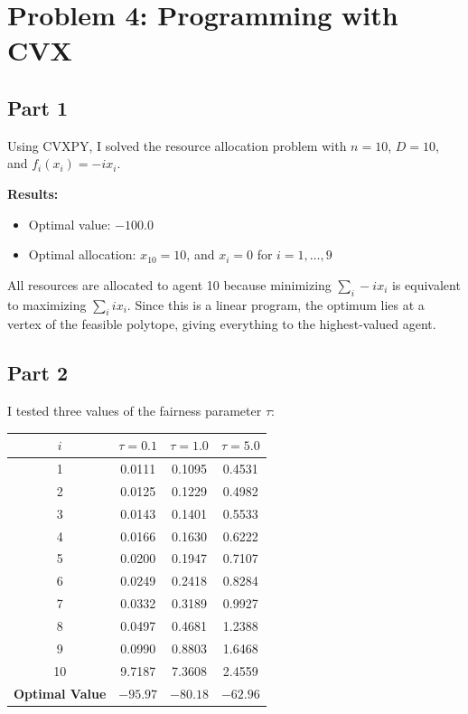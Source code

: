 \documentclass[11pt]{article}
\begin{document}
\section*{Problem 4: Programming with CVX}

\subsection*{Part 1}

Using CVXPY, I solved the resource allocation problem with $n = 10$, $D = 10$, and $f_i(x_i) = -ix_i$.

\textbf{Results:}
\begin{itemize}
    \item Optimal value: $-100.0$
    \item Optimal allocation: $x_{10} = 10$, and $x_i = 0$ for $i = 1, \ldots, 9$
\end{itemize}

All resources are allocated to agent 10 because minimizing $\sum_{i} -ix_i$ is equivalent to maximizing $\sum_{i} ix_i$. Since this is a linear program, the optimum lies at a vertex of the feasible polytope, giving everything to the highest-valued agent.

\subsection*{Part 2}

I tested three values of the fairness parameter $\tau$:

\begin{table}[h]
\centering
\begin{tabular}{c|ccc}
\toprule
$i$ & $\tau = 0.1$ & $\tau = 1.0$ & $\tau = 5.0$ \\
\midrule
1  & 0.0111 & 0.1095 & 0.4531 \\
2  & 0.0125 & 0.1229 & 0.4982 \\
3  & 0.0143 & 0.1401 & 0.5533 \\
4  & 0.0166 & 0.1630 & 0.6222 \\
5  & 0.0200 & 0.1947 & 0.7107 \\
6  & 0.0249 & 0.2418 & 0.8284 \\
7  & 0.0332 & 0.3189 & 0.9927 \\
8  & 0.0497 & 0.4681 & 1.2388 \\
9  & 0.0990 & 0.8803 & 1.6468 \\
10 & 9.7187 & 7.3608 & 2.4559 \\
\midrule
\textbf{Optimal Value} & $-95.97$ & $-80.18$ & $-62.96$ \\
\bottomrule
\end{tabular}
\end{table}
\end{document}
